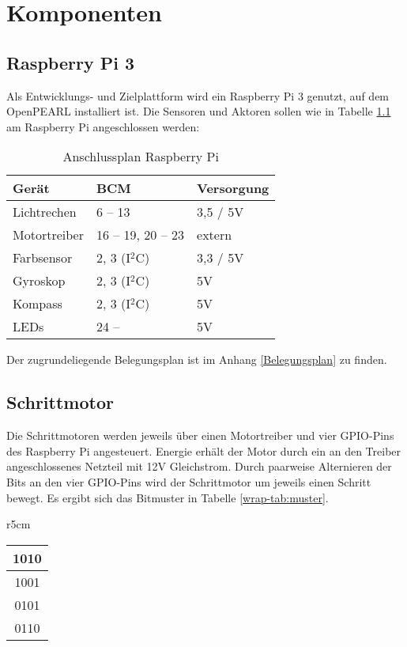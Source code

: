 \chapter{Komponenten}
\label{komponenten}
\section{Raspberry Pi 3}
Als Entwicklungs- und Zielplattform wird ein Raspberry Pi 3 genutzt, auf dem OpenPEARL installiert ist. Die Sensoren und Aktoren sollen wie in Tabelle \ref{tab:anschlussplan} am Raspberry Pi angeschlossen werden:

\begin{table} [H]
	\begin{center}
		 \renewcommand{\arraystretch}{1.5}
		\begin{tabular}{|l|l|l|}
			\hline
			\textbf{Gerät} & \textbf{BCM} & \textbf{Versorgung}\\
			\hline
			Lichtrechen & 6 -- 13 & 3,5 / 5V\\
			\hline
			Motortreiber& 16 -- 19, 20 -- 23 & extern\\
			\hline
			Farbsensor & 2, 3 (I$^2$C) & 3,3 / 5V\\
			\hline
			Gyroskop & 2, 3 (I$^2$C) & 5V\\
			\hline
			Kompass & 2, 3 (I$^2$C) & 5V\\
			\hline
			LEDs & 24 -- & 5V\\
			\hline
		\end{tabular}
	\end{center}
\caption{Anschlussplan Raspberry Pi}\label{tab:anschlussplan}
\end{table}

Der zugrundeliegende Belegungsplan ist im Anhang \ref{Belegungsplan} zu finden.


\section{Schrittmotor}
Die Schrittmotoren werden jeweils über einen Motortreiber und vier GPIO-Pins des Raspberry Pi angesteuert. Energie erhält der Motor durch ein an den Treiber angeschlossenes Netzteil mit 12V Gleichstrom. Durch paarweise Alternieren der Bits an den vier GPIO-Pins wird der Schrittmotor um jeweils einen Schritt bewegt. Es ergibt sich das Bitmuster in Tabelle \ref{wrap-tab:muster}.
\begin{wraptable}{r}{5cm}
	\begin{center}
		\begin{tabular}{|c|}
			\hline
			1010\\
			\hline
			1001\\
			\hline
			0101\\
			\hline
			0110\\
			\hline
		\end{tabular}
	\end{center}
	\caption{Bitmuster}\label{wrap-tab:muster}
\end{wraptable}

